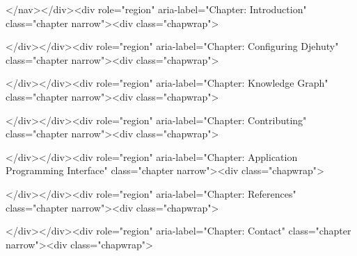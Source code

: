 \documentclass[12pt,a4paper]{book}
\begin{document}
{{{{{{\tableofcontents

\ifdefined\HCode
\else
\listoffigures
\fi

\newpage{}
\hypersetup{linkcolor=LinkGray}
\setcounter{page}{1}

\ifdefined\HCode
\begin{html}
</nav></div><div role="region" aria-label="Chapter: Introduction" class="chapter narrow"><div class="chapwrap">
\end{html}
\fi



\ifdefined\HCode
\begin{html}
</div></div><div role="region" aria-label="Chapter: Configuring Djehuty" class="chapter narrow"><div class="chapwrap">
\end{html}
\fi



\ifdefined\HCode
\begin{html}
</div></div><div role="region" aria-label="Chapter: Knowledge Graph" class="chapter narrow"><div class="chapwrap">
\end{html}
\fi



\ifdefined\HCode
\begin{html}
</div></div><div role="region" aria-label="Chapter: Contributing" class="chapter narrow"><div class="chapwrap">
\end{html}
\fi



\ifdefined\HCode
\begin{html}
</div></div><div role="region" aria-label="Chapter: Application Programming Interface" class="chapter narrow"><div class="chapwrap">
\end{html}
\fi



\ifdefined\HCode
\begin{html}
</div></div><div role="region" aria-label="Chapter: References" class="chapter narrow"><div class="chapwrap">
\end{html}
\fi



\ifdefined\HCode
\begin{html}
</div></div><div role="region" aria-label="Chapter: Contact" class="chapter narrow"><div class="chapwrap">
\end{html}
\fi

}}}}}}
\end{document}
